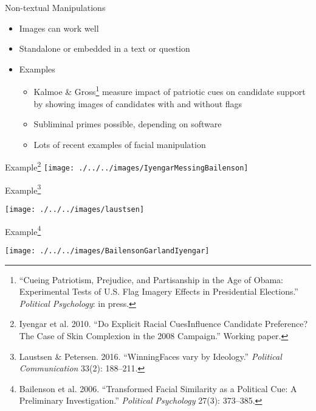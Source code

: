 \documentclass[
  ignorenonframetext,
]{beamer}
\begin{document}
\begin{frame}{Non-textual Manipulations}
\protect\hypertarget{non-textual-manipulations}{}
\small

\begin{itemize}\itemsep0.5em
\item Images can work well
\item Standalone or embedded in a text or question
\item<2-> Examples
    \begin{itemize}\footnotesize
    \item<2-> Kalmoe \& Gross\footnote{``Cueing Patriotism, Prejudice, and Partisanship in the Age of Obama: Experimental Tests of U.S. Flag Imagery Effects in Presidential Elections.'' \textit{Political Psychology}: in press.} measure impact of patriotic cues on candidate support by showing images of candidates with and without flags
    \item<3-> Subliminal primes possible, depending on software
    \item<4-> Lots of recent examples of facial manipulation
    \end{itemize}

\end{itemize}
\end{frame}

\begin{frame}{Example\footnote{Iyengar et al. 2010. ``Do Explicit Racial CuesInfluence Candidate Preference? The Case of Skin Complexion in the 2008 Campaign.'' Working paper.}}
\protect\hypertarget{example}{}
\texttt{[image: ./../../images/IyengarMessingBailenson]}
\end{frame}

\begin{frame}{Example\footnote{Laustsen \& Petersen. 2016. ``WinningFaces vary by Ideology.'' \textit{Political Communication} 33(2): 188--211.}}
\protect\hypertarget{example-1}{}
\begin{center}
\texttt{[image: ./../../images/laustsen]}
\end{center}
\end{frame}

\begin{frame}{Example\footnote{Bailenson et al. 2006. ``Transformed Facial Similarity as a Political Cue: A Preliminary Investigation.'' \textit{Political Psychology} 27(3): 373--385.}}
\protect\hypertarget{example-2}{}
\begin{center}
\texttt{[image: ./../../images/BailensonGarlandIyengar]}
\end{center}
\end{frame}
\end{document}
